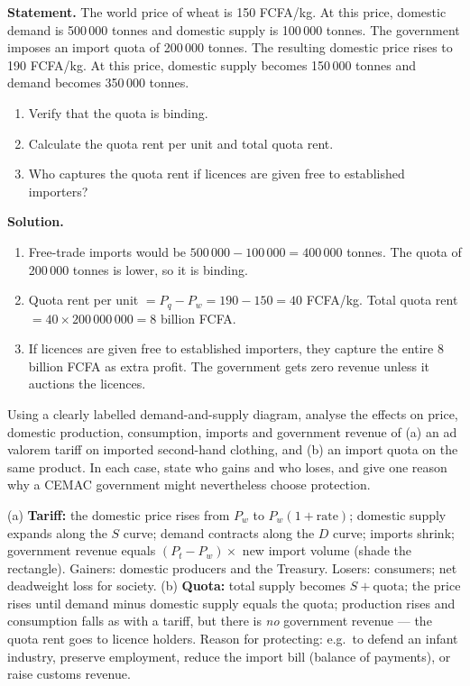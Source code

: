 \documentclass[11pt]{article}
\begin{document}
\begin{exoresolu}
\textbf{Statement.} The world price of wheat is 150 FCFA/kg. At this price, domestic demand is 500\,000 tonnes and domestic supply is 100\,000 tonnes. The government imposes an import quota of 200\,000 tonnes. The resulting domestic price rises to 190 FCFA/kg. At this price, domestic supply becomes 150\,000 tonnes and demand becomes 350\,000 tonnes.
\begin{enumerate}
\item Verify that the quota is binding.
\item Calculate the quota rent per unit and total quota rent.
\item Who captures the quota rent if licences are given free to established importers?
\end{enumerate}
\tcblower
\textbf{Solution.}
\begin{enumerate}
\item Free-trade imports would be $500\,000 - 100\,000 = 400\,000$ tonnes. The quota of 200\,000 tonnes is lower, so it is binding.
\item Quota rent per unit $= P_q - P_w = 190 - 150 = 40$ FCFA/kg. Total quota rent $= 40 \times 200\,000\,000 = 8$ billion FCFA.
\item If licences are given free to established importers, they capture the entire 8 billion FCFA as extra profit. The government gets zero revenue unless it auctions the licences.
\end{enumerate}
\end{exoresolu}

\begin{exercice}[Practice]
Using a clearly labelled demand-and-supply diagram, analyse the effects on price, domestic production, consumption, imports and government revenue of (a) an ad valorem tariff on imported second-hand clothing, and (b) an import quota on the same product. In each case, state who gains and who loses, and give one reason why a CEMAC government might nevertheless choose protection.
\end{exercice}

\begin{corrige}[Exercise 1]
(a) \textbf{Tariff:} the domestic price rises from $P_w$ to $P_w(1 + \text{rate})$; domestic supply expands along the $S$ curve; demand contracts along the $D$ curve; imports shrink; government revenue equals $(P_t - P_w) \times$ new import volume (shade the rectangle). Gainers: domestic producers and the Treasury. Losers: consumers; net deadweight loss for society.
(b) \textbf{Quota:} total supply becomes $S + \text{quota}$; the price rises until demand minus domestic supply equals the quota; production rises and consumption falls as with a tariff, but there is \emph{no} government revenue --- the quota rent goes to licence holders.
Reason for protecting: e.g.\ to defend an infant industry, preserve employment, reduce the import bill (balance of payments), or raise customs revenue.
\end{corrige}
\end{document}
